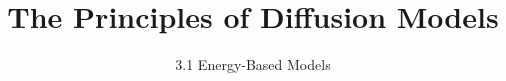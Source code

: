 
\title{The Principles of Diffusion Models}
\subtitle{3.1 Energy-Based Models}


\begin{frame}
    \titlepage
\end{frame}


